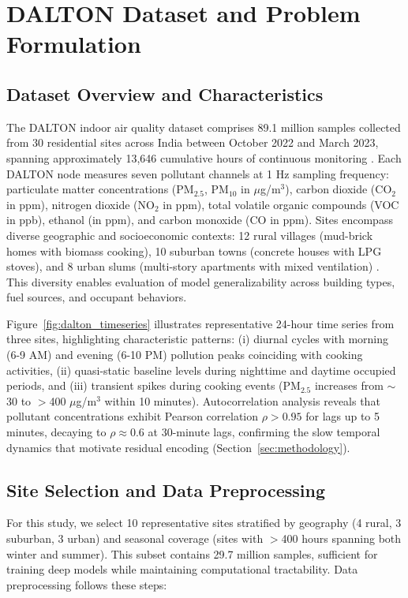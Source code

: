 \section{DALTON Dataset and Problem Formulation}
\label{sec:dataset}

\subsection{Dataset Overview and Characteristics}

The DALTON indoor air quality dataset comprises 89.1 million samples collected from 30 residential sites across India between October 2022 and March 2023, spanning approximately 13,646 cumulative hours of continuous monitoring \cite{karmakar2024indoor}. Each DALTON node measures seven pollutant channels at 1 Hz sampling frequency: particulate matter concentrations (PM$_{2.5}$, PM$_{10}$ in $\mu$g/m$^3$), carbon dioxide (CO$_2$ in ppm), nitrogen dioxide (NO$_2$ in ppm), total volatile organic compounds (VOC in ppb), ethanol (in ppm), and carbon monoxide (CO in ppm). Sites encompass diverse geographic and socioeconomic contexts: 12 rural villages (mud-brick homes with biomass cooking), 10 suburban towns (concrete houses with LPG stoves), and 8 urban slums (multi-story apartments with mixed ventilation) \cite{karmakar2024exploring}. This diversity enables evaluation of model generalizability across building types, fuel sources, and occupant behaviors.

Figure~\ref{fig:dalton_timeseries} illustrates representative 24-hour time series from three sites, highlighting characteristic patterns: (i) diurnal cycles with morning (6-9 AM) and evening (6-10 PM) pollution peaks coinciding with cooking activities, (ii) quasi-static baseline levels during nighttime and daytime occupied periods, and (iii) transient spikes during cooking events (PM$_{2.5}$ increases from $\sim$30 to $>$400 $\mu$g/m$^3$ within 10 minutes). Autocorrelation analysis reveals that pollutant concentrations exhibit Pearson correlation $\rho > 0.95$ for lags up to 5 minutes, decaying to $\rho \approx 0.6$ at 30-minute lags, confirming the slow temporal dynamics that motivate residual encoding (Section~\ref{sec:methodology}).

\subsection{Site Selection and Data Preprocessing}

For this study, we select 10 representative sites stratified by geography (4 rural, 3 suburban, 3 urban) and seasonal coverage (sites with $>$400 hours spanning both winter and summer). This subset contains 29.7 million samples, sufficient for training deep models while maintaining computational tractability. Data preprocessing follows these steps:

